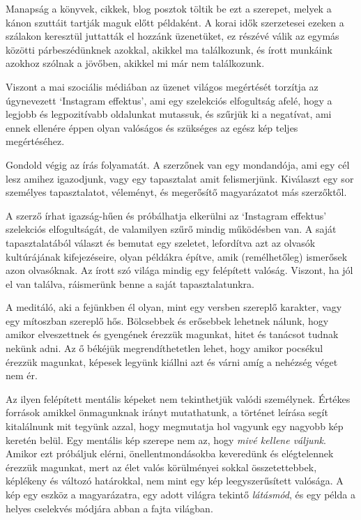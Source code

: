 Manapság a könyvek, cikkek, blog posztok töltik be ezt a szerepet,
melyek a kánon szuttáit tartják maguk előtt példaként. A korai idők
szerzetesei ezeken a szálakon keresztül juttatták el hozzánk üzenetüket,
ez részévé válik az egymás közötti párbeszédünknek azokkal, akikkel ma
találkozunk, és írott munkáink azokhoz szólnak a jövőben, akikkel mi már
nem találkozunk.

Viszont a mai szociális médiában az üzenet világos megértését torzítja
az úgynevezett `Instagram effektus', ami egy szelekciós elfogultság
afelé, hogy a legjobb és legpozitívabb oldalunkat mutassuk, és szűrjük
ki a negatívat, ami ennek ellenére éppen olyan valóságos és szükséges az
egész kép teljes megértéséhez.

Gondold végig az írás folyamatát. A szerzőnek van egy mondandója, ami
egy cél lesz amihez igazodjunk, vagy egy tapasztalat amit felismerjünk.
Kiválaszt egy sor személyes tapasztalatot, véleményt, és megerősítő
magyarázatot más szerzőktől.

A szerző írhat igazság-hűen és próbálhatja elkerülni az `Instagram
effektus' szelekciós elfogultságát, de valamilyen szűrő mindig
működésben van. A saját tapasztalatából választ és bemutat egy szeletet,
lefordítva azt az olvasók kultúrájának kifejezéseire, olyan példákra
építve, amik (remélhetőleg) ismerősek azon olvasóknak. Az írott szó
világa mindig egy felépített valóság. Viszont, ha jól el van találva,
ráismerünk benne a saját tapasztalatunkra.

A meditáló, aki a fejünkben él olyan, mint egy versben szereplő
karakter, vagy egy mítoszban szereplő hős. Bölcsebbek és erősebbek
lehetnek nálunk, hogy amikor elveszettnek és gyengének érezzük magunkat,
hitet és tanácsot tudnak nekünk adni. Az ő békéjük megrendíthetetlen
lehet, hogy amikor pocsékul érezzük magunkat, képesek legyünk kiállni
azt és várni amíg a nehézség véget nem ér.

Az ilyen felépített mentális képeket nem tekinthetjük valódi személynek.
Értékes források amikkel önmagunknak irányt mutathatunk, a történet
leírása segít kitalálnunk mit tegyünk azzal, hogy megmutatja hol vagyunk
egy nagyobb kép keretén belül. Egy mentális kép szerepe nem az, hogy
\emph{mivé kellene váljunk}. Amikor ezt próbáljuk elérni,
önellentmondásokba keveredünk és elégtelennek érezzük magunkat, mert az
élet valós körülményei sokkal összetettebbek, képlékeny és változó
határokkal, nem mint egy kép leegyszerűsített valósága. A kép egy eszköz
a magyarázatra, egy adott világra tekintő \emph{látásmód}, és egy példa
a helyes cselekvés módjára abban a fajta világban.

